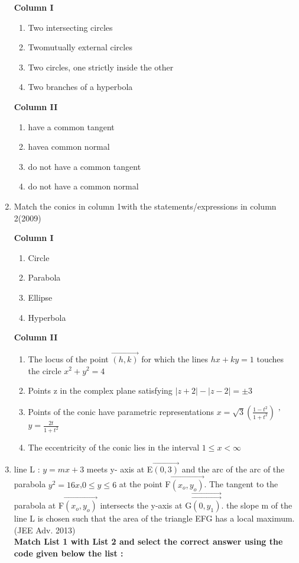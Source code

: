 \begin{enumerate}
\begin{multicols}{2}
\textbf{Column I}
\begin{enumerate}
    \item  Two intersecting circles
    \item Twomutually external circles
    \item Two circles, one strictly inside the other 
    \item  Two branches of a hyperbola  
\end{enumerate} 

\textbf{Column II}
\begin{enumerate}
    \item have a common tangent 
    \item havea common normal 
    \item do not have a common tangent
    \item do not have a common normal
\end{enumerate}
\end{multicols}


\item Match the conics in column 1with the statements/expressions in column 2\hfill{(2009)}

\begin{multicols}{2}
\textbf{Column I}
\begin{enumerate}
    \item  Circle
    \item  Parabola
    \item  Ellipse 
    \item  Hyperbola  
\end{enumerate} 
\columnbreak
\textbf{Column II}
\begin{enumerate}
	\item The locus of the point $\vec{(h,k)}$ for which the lines $hx + ky =1$ touches the circle $x^2 + y^2 = 4$
    \item Points z in the complex plane satisfying $|z + 2|- |z - 2|= \pm 3$
    \item Points of the conic have parametric representations $x=\sqrt{3}
(\frac{1 - t^2}{1 + t^2})$ ' $ y = \frac{2t}{1 + t^2}$

    \item The eccentricity of the conic lies in the interval $1 \leq x < \infty$

\end{enumerate}
\end{multicols}

\item line L : $y = mx + 3$ meets y- axis at E$\vec{(0,3)}$ and the arc of the arc of the parabola $y^2 = 16x$,$ 0\leq y \leq6$ at the point F$\vec{(x_o,y_o)}$. The tangent to the parabola at F$\vec{(x_o,y_o)}$ intersects the y-axis at G$\vec\vec{(0,y_1)}$. the slope m of the line L is chosen such that the area of the triangle EFG has a local maximum.\hfill{(JEE Adv. 2013)} \\
\textbf{Match List 1 with List 2 and select the correct answer using the code given below the list :}


\end{enumerate}
